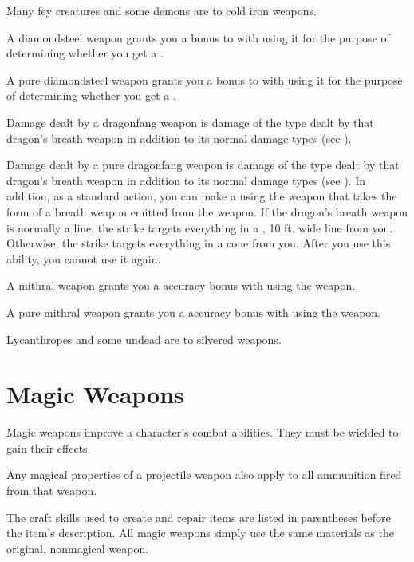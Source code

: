          Many fey creatures and some demons are  to cold iron weapons.

         A diamondsteel weapon grants you a  bonus to  with  using it for the purpose of determining whether you get a .

         A pure diamondsteel weapon grants you a  bonus to  with  using it for the purpose of determining whether you get a .

         Damage dealt by a dragonfang weapon is damage of the type dealt by that dragon's breath weapon in addition to its normal damage types (see ).

         Damage dealt by a pure dragonfang weapon is damage of the type dealt by that dragon's breath weapon in addition to its normal damage types (see ).
        In addition, as a standard action, you can make a  using the weapon that takes the form of a breath weapon emitted from the weapon.
        If the dragon's breath weapon is normally a line, the strike targets everything in a \arealarge, 10 ft. wide line from you.
        Otherwise, the strike targets everything in a \areamed cone from you.
        After you use this ability, you  cannot use it again.

         A mithral weapon grants you a  accuracy bonus with  using the weapon.

         A pure mithral weapon grants you a  accuracy bonus with  using the weapon.

         Lycanthropes and some undead are  to silvered weapons.

\newpage
\section{Magic Weapons}
    Magic weapons improve a character's combat abilities.
    They must be wielded to gain their effects.

     Any magical properties of a projectile weapon also apply to all ammunition fired from that weapon.

     The craft skills used to create and repair items are listed in parentheses before the item's description.
    All magic weapons simply use the same materials as the original, nonmagical weapon.


